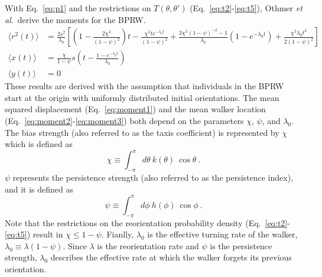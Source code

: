 With Eq.\ \ref{eq:p1} and the restrictions on $T(\theta,\theta')$ (Eq.\ \ref{eq:t2}-\ref{eq:t5}), Othmer \textit{et al}.\ derive the moments for the BPRW.
\begin{align} \label{eq:moment1}
    \langle r^2(t) \rangle &= \frac{2s^2}{\lambda_0} \left[ \left(1-\frac{2\chi^2}{(1-\psi)^2}\right)t
    - \frac{\chi^2 t e^{-\lambda_0 t}}{(1-\psi)^2}
    + \frac{3\chi^2(1-\psi)^{-2}-1}{\lambda_0} \left(1-e^{-\lambda_0 t}\right)
    + \frac{\chi^2 \lambda_0 t^2}{2(1-\psi)^2} \right] \\
    \langle x(t) \rangle &= \frac{\chi}{1-\psi} s \left(t -\frac{1-e^{-\lambda_0 t}}{\lambda_0} \right) \label{eq:moment2} \\
    \langle y(t) \rangle &= 0 \label{eq:moment3}
\end{align}
These results are derived with the assumption that individuals in the BPRW start at the origin with uniformly distributed initial orientations.
The mean squared displacement (Eq.\ \ref{eq:moment1}) and the mean walker location (Eq.\ \ref{eq:moment2}-\ref{eq:moment3}) both depend on the parameters $\chi$, $\psi$, and $\lambda_0$. The bias strength (also referred to as the taxis coefficient) is represented by $\chi$ which is defined as
\begin{equation} \label{eq:chi}
    \chi \equiv \int_{-\pi}^{\pi} d\theta \ k(\theta) \ \cos\theta \ .
\end{equation}
$\psi$ represents the persistence strength (also referred to as the persistence index), and it is defined as
\begin{equation} \label{eq:psi}
    \psi \equiv \int_{-\pi}^{\pi} d\phi \ h(\phi) \ \cos\phi \ .
\end{equation}
Note that the restrictions on the reorientation probability density (Eq.\ \ref{eq:t2}-\ref{eq:t5}) result in $\chi \leq 1 - \psi$. Fianlly, $\lambda_0$ is the effective turning rate of the walker,
$\lambda_0 \equiv \lambda(1-\psi)$.
Since $\lambda$ is the reorientation rate and $\psi$ is the persistence strength, $\lambda_0$ describes the effective rate at which the walker forgets its previous orientation.

